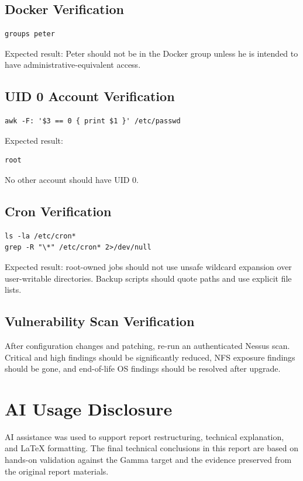 \documentclass[11pt,a4paper]{report}
\begin{document}
\section{Docker Verification}
\begin{lstlisting}[style=terminal]
groups peter
\end{lstlisting}
Expected result: Peter should not be in the Docker group unless he is intended to have administrative-equivalent access.

\section{UID 0 Account Verification}
\begin{lstlisting}[style=terminal]
awk -F: '$3 == 0 { print $1 }' /etc/passwd
\end{lstlisting}
Expected result:
\begin{lstlisting}[style=plaincode]
root
\end{lstlisting}
No other account should have UID 0.

\section{Cron Verification}
\begin{lstlisting}[style=terminal]
ls -la /etc/cron*
grep -R "\*" /etc/cron* 2>/dev/null
\end{lstlisting}
Expected result: root-owned jobs should not use unsafe wildcard expansion over user-writable directories. Backup scripts should quote paths and use explicit file lists.

\section{Vulnerability Scan Verification}
After configuration changes and patching, re-run an authenticated Nessus scan. Critical and high findings should be significantly reduced, NFS exposure findings should be gone, and end-of-life OS findings should be resolved after upgrade.

\chapter*{AI Usage Disclosure}
AI assistance was used to support report restructuring, technical explanation, and LaTeX formatting. The final technical conclusions in this report are based on hands-on validation against the Gamma target and the evidence preserved from the original report materials.
\end{document}
